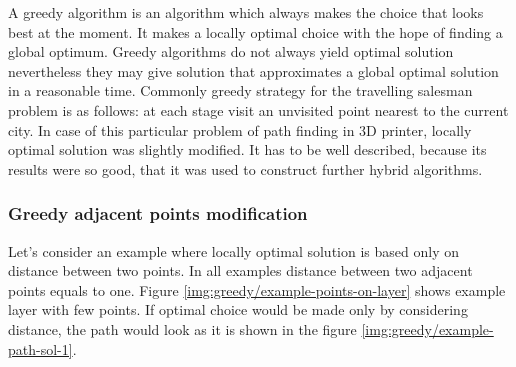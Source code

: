 \documentclass[titlepage]{article}
\begin{document}
A greedy algorithm is an algorithm which always makes the choice that looks best at the moment. It makes a locally optimal choice with the hope of finding a global optimum. Greedy algorithms do not always yield optimal solution nevertheless they may give solution that approximates a global optimal solution in a reasonable time. Commonly greedy strategy for the travelling salesman problem is as follows: at each stage visit an unvisited point nearest to the current city. In case of this particular problem of path finding in 3D printer, locally optimal solution was slightly modified. It has to be well described, because its results were so good, that it was used to construct further hybrid algorithms.

\subsubsection{Greedy adjacent points modification}

Let's consider an example where locally optimal solution is based only on distance between two points. In all examples distance between two adjacent points equals to one. Figure \ref{img:greedy/example-points-on-layer} shows example layer with few points. If optimal choice would be made only by considering distance, the path would look as it is shown in the figure \ref{img:greedy/example-path-sol-1}.
\end{document}
